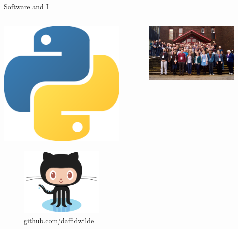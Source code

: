 \documentclass{beamer}
\begin{document}
\begin{frame}{Software and I}

    \begin{columns}[T]
        \begin{column}{.5\textwidth}
            \centering
            \includegraphics[width=.6\linewidth]{python.png}\\
            \vspace{10pt}
            \begin{figure}
                \includegraphics[width=.75\linewidth]{github.png}
                \caption{\tiny github.com/daffidwilde}
            \end{figure}
        \end{column}
        \begin{column}{.5\textwidth}
            \centering
            \begin{figure}
                \includegraphics[width=.9\linewidth]{collabw18.jpg}

\end{figure}
\end{column}
\end{columns}
\end{frame}
\end{document}
